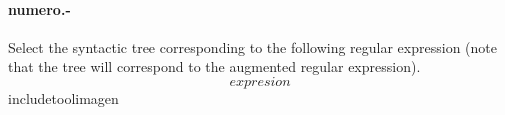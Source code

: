 

\paragraph{{numero}.-}\label{p{numero}}
Select the syntactic tree corresponding to the following regular expression (note that the tree will correspond to the augmented regular expression).
\[
    {expresion}
\]
{includetool}{{imagen}}

